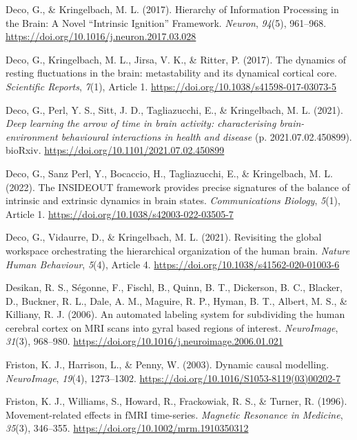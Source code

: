 \begin{CSLReferences}{1}{0}
Deco, G., \& Kringelbach, M. L. (2017). Hierarchy of Information
Processing in the Brain: A Novel {``Intrinsic Ignition''} Framework.
\emph{Neuron}, \emph{94}(5), 961--968.
\url{https://doi.org/10.1016/j.neuron.2017.03.028}

Deco, G., Kringelbach, M. L., Jirsa, V. K., \& Ritter, P. (2017). The
dynamics of resting fluctuations in the brain: metastability and its
dynamical cortical core. \emph{Scientific Reports}, \emph{7}(1), Article
1. \url{https://doi.org/10.1038/s41598-017-03073-5}

Deco, G., Perl, Y. S., Sitt, J. D., Tagliazucchi, E., \& Kringelbach, M.
L. (2021). \emph{Deep learning the arrow of time in brain activity:
characterising brain-environment behavioural interactions in health and
disease} (p. 2021.07.02.450899). bioRxiv.
\url{https://doi.org/10.1101/2021.07.02.450899}

Deco, G., Sanz Perl, Y., Bocaccio, H., Tagliazucchi, E., \& Kringelbach,
M. L. (2022). The INSIDEOUT framework provides precise signatures of the
balance of intrinsic and extrinsic dynamics in brain states.
\emph{Communications Biology}, \emph{5}(1), Article 1.
\url{https://doi.org/10.1038/s42003-022-03505-7}

Deco, G., Vidaurre, D., \& Kringelbach, M. L. (2021). Revisiting the
global workspace orchestrating the hierarchical organization of the
human brain. \emph{Nature Human Behaviour}, \emph{5}(4), Article 4.
\url{https://doi.org/10.1038/s41562-020-01003-6}

Desikan, R. S., Ségonne, F., Fischl, B., Quinn, B. T., Dickerson, B. C.,
Blacker, D., Buckner, R. L., Dale, A. M., Maguire, R. P., Hyman, B. T.,
Albert, M. S., \& Killiany, R. J. (2006). An automated labeling system
for subdividing the human cerebral cortex on MRI scans into gyral based
regions of interest. \emph{NeuroImage}, \emph{31}(3), 968--980.
\url{https://doi.org/10.1016/j.neuroimage.2006.01.021}

Friston, K. J., Harrison, L., \& Penny, W. (2003). Dynamic causal
modelling. \emph{NeuroImage}, \emph{19}(4), 1273--1302.
\url{https://doi.org/10.1016/S1053-8119(03)00202-7}

Friston, K. J., Williams, S., Howard, R., Frackowiak, R. S., \& Turner,
R. (1996). Movement-related effects in fMRI time-series. \emph{Magnetic
Resonance in Medicine}, \emph{35}(3), 346--355.
\url{https://doi.org/10.1002/mrm.1910350312}


\end{CSLReferences}
